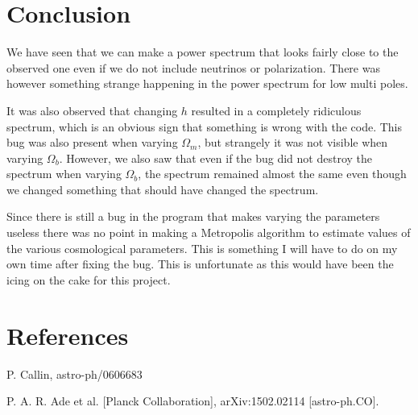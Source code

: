 \documentclass[a4paper]{report}
\begin{document}
\section{Conclusion}\label{sec:Conc}
We have seen that we can make a power spectrum that looks fairly close to the observed one even if we do not include neutrinos or polarization. There was however something strange happening in the power spectrum for low multi poles. 

It was also observed that changing $h$ resulted in a completely ridiculous spectrum, which is an obvious sign that something is wrong with the code. This bug was also present when varying $\Omega_m$, but strangely it was not visible when varying $\Omega_b$. However, we also saw that even if the bug did not destroy the spectrum when varying $\Omega_b$, the spectrum remained almost the same even though we changed something that should have changed the spectrum.

Since there is still a bug in the program that makes varying the parameters useless there was no point in making a Metropolis algorithm to estimate values of the various cosmological parameters. This is something I will have to do on my own time after fixing the bug. This is unfortunate as this would have been the icing on the cake for this project.


\section{References}
\begin{enumerate}[label= {[}\arabic*{]} ]
 \item P. Callin, astro-ph/0606683
 \item P. A. R. Ade et al. [Planck Collaboration], arXiv:1502.02114 [astro-ph.CO].
\end{enumerate}

\onecolumn 
\end{document}
